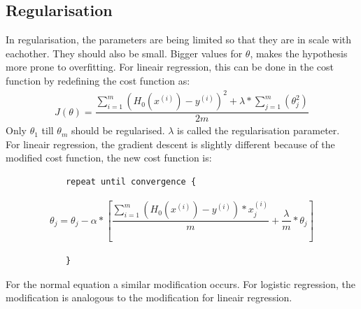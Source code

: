 \subsection{Regularisation}
In regularisation, the parameters are being limited so that they are in scale with eachother. They should also be small. Bigger values for $\theta$, makes the hypothesis more prone to overfitting.  For lineair regression, this can be done in the cost function by redefining the cost function as:
\begin{align}
J(\theta) = \dfrac{\sum\limits_{i=1}^m(H_0(x^{(i)}) - y^{(i)})^2 + \lambda * \sum\limits_{j=1}^m(\theta_j^2)}{2m}
\end{align}
Only $\theta_1$ till $\theta_m$ should be regularised. $\lambda$ is called the regularisation parameter. \\

\noindent For lineair regression, the gradient descent is slightly different because of the modified cost function, the new cost function is:
\begin{lstlisting}
            repeat until convergence {
 \end{lstlisting}
\begin{align}
    \theta_j = \theta_j - \alpha * [  \dfrac{\sum\limits_{i=1}^m(H_0(x^{(i)}) - y^{(i)}) * x_j^{(i)}}{m} +  \dfrac{\lambda}{m} * \theta_j]
    \end{align}
\begin{lstlisting}
            }
 \end{lstlisting}
 \noindent For the normal equation a similar modification occurs. 
For logistic regression, the modification is analogous to the modification for lineair regression.

